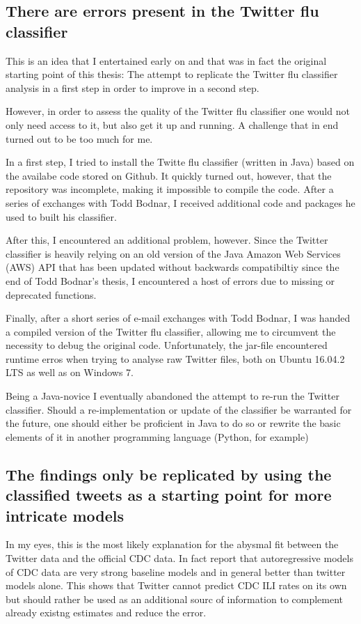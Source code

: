 \documentclass[11pt, a4paper]{article}\usepackage[]{graphicx}\usepackage[]{color}
\begin{document}
\subsection{There are errors present in the Twitter flu classifier}
This is an idea that I entertained early on and that was in fact the original starting point of this thesis: The attempt to replicate the Twitter flu classifier analysis in a first step in order to improve in a second step.\newline

However, in order to assess the quality of the Twitter flu classifier one would not only need access to it, but also get it up and running. A challenge that in end turned out to be too much for me.\newline

In a first step, I tried to install the Twitte flu classifier (written in Java) based on the availabe code stored on Github. It quickly turned out, however, that the repository was incomplete, making it impossible to compile the code. After a series of exchanges with Todd Bodnar, I received additional code and packages he used to built his classifier.\newline

After this, I encountered an additional problem, however. Since the Twitter classifier is heavily relying on an old version of the Java Amazon Web Services (AWS) API that has been updated without backwards compatibiltiy since the end of Todd Bodnar's thesis, I encountered a host of errors due to missing or deprecated functions.\newline

Finally, after a short series of e-mail exchanges with Todd Bodnar, I was handed a compiled version of the Twitter flu classifier, allowing me to circumvent the necessity to debug the original code. Unfortunately, the jar-file encountered runtime erros when trying to analyse raw Twitter files, both on Ubuntu 16.04.2 LTS as well as on Windows 7.\newline

Being a Java-novice I eventually abandoned the attempt to re-run the Twitter classifier. Should a re-implementation or update of the classifier be warranted for the future, one should either be proficient in Java to do so or rewrite the basic elements of it in another programming language (Python, for example)

\subsection{The findings only be replicated by using the classified tweets as a starting point for more intricate models}
In my eyes, this is the most likely explanation for the abysmal fit between the Twitter data and the official CDC data. In fact \citep{paul_worldwide_2015} report that autoregressive models of CDC data are very strong baseline models and in general better than twitter models alone. This shows that Twitter cannot predict CDC ILI rates on its own but should rather be used as an additional sourc of information to complement already existng estimates and reduce the error.
\end{document}
